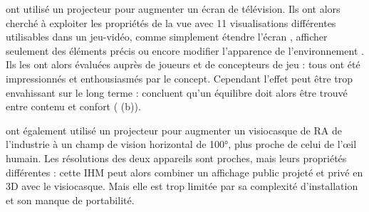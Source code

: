 
\cite{Jones2013} ont utilisé un projecteur pour augmenter un écran de télévision. Ils ont alors cherché à exploiter les propriétés de la vue  avec 11 visualisations différentes utilisables dans un jeu-vidéo, comme simplement étendre l'écran , afficher seulement des éléments précis  ou encore modifier l'apparence de l'environnement . Ils les ont alors évaluées auprès de joueurs et de concepteurs de jeu : tous ont été impressionnés et enthousiasmés par le concept. Cependant l'effet peut être trop envahissant sur le long terme : \cite{Jones2013} concluent qu'un équilibre doit alors être trouvé entre contenu et confort ( (b)).

\cite{Benko2015} ont également utilisé un projecteur pour augmenter un visiocasque de RA de l'industrie  à un champ de vision horizontal de \ang{100}, plus proche de celui de l'\oe il humain. Les résolutions des deux appareils sont proches, mais leurs propriétés différentes : cette IHM peut alors combiner un affichage public projeté et privé en 3D avec le visiocasque. Mais elle est trop limitée par sa complexité d'installation et son manque de portabilité.


